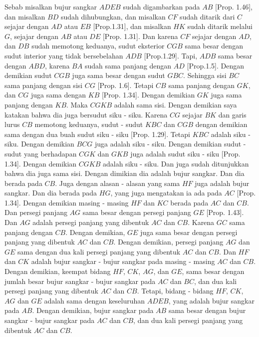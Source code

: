 \documentclass[a4paper]{book}
\begin{document}
Sebab misalkan bujur sangkar $ADEB$ sudah digambarkan pada $AB$ [Prop. 1.46], dan
misalkan $BD$ sudah dihubungkan, dan misalkan $CF$ sudah ditarik dari $C$ sejajar
dengan $AD$ atau $EB$ [Prop.1.31], dan misalkan $HK$ sudah ditarik melalui $G$, 
sejajar dengan $AB$ atau $DE$ [Prop. 1.31]. Dan karena $CF$ sejajar dengan $AD$, 
dan $DB$ sudah memotong keduanya, sudut eksterior $CGB$ sama besar dengan sudut
interior yang tidak bersebelahan $ADB$ [Prop.1.29]. Tapi, $ADB$ sama besar dengan
$ABD$, karena $BA$ sudah sama panjang dengan $AD$ [Prop.1.5]. Dengan demikian 
sudut $CGB$ juga sama besar dengan sudut $GBC$. Sehingga sisi $BC$ sama panjang
dengan sisi $CG$ [Prop. 1.6]. Tetapi $CB$ sama panjang dengan $GK$, dan $CG$ 
juga sama dengan $KB$ [Prop. 1.34]. Dengan demikian $GK$ juga sama panjang dengan 
$KB$. Maka $CGKB$ adalah sama sisi. Dengan demikian saya katakan bahwa dia juga
bersudut siku - siku. Karena $CG$ sejajar $BK$ dan garis lurus $CB$ memotong 
keduanya, sudut - sudut $KBC$ dan $CGB$ dengan demikian sama dengan dua buah sudut
siku - siku [Prop. 1.29]. Tetapi $KBC$ adalah siku - siku. Dengan demikian
$BCG$ juga adalah siku - siku. Dengan demikian sudut - sudut yang berhadapan
$CGK$ dan $GKB$ juga adalah sudut siku - siku [Prop. 1.34]. Dengan demikian
$CGKB$ adalah siku - siku. Dan juga sudah ditunjukkan bahwa dia juga sama sisi. 
Dengan dimikian dia adalah bujur sangkar. Dan dia berada pada $CB$. 
Juga dengan alasan - alasan yang sama $HF$ juga adalah bujur sangkar. Dan  dia 
berada pada $HG$, yang juga mengatakan ia ada pada $AC$ [Prop. 1.34]. Dengan 
demikian masing - masing $HF$ dan $KC$  berada pada $AC$ dan $CB$. Dan 
persegi panjang $AG$ sama besar dengan persegi panjang $GE$ [Prop. 1.43]. Dan 
$AG$ adalah persegi panjang yang dibentuk $AC$ dan $CB$. 
Karena $GC$ sama panjang dengan $CB$. Dengan demikian, $GE$ juga sama besar 
dengan persegi panjang yang dibentuk $AC$ dan $CB$. Dengan demikian, persegi 
panjang $AG$ dan $GE$ sama dengan dua kali persegi panjang yang dibentuk
$AC$ dan $CB$. Dan $HF$ dan $CK$ adalah bujur sangkar - bujur sangkar pada 
masing - masing $AC$ dan $CB$. Dengan demikian, keempat bidang $HF$, $CK$, 
$AG$, dan $GE$, sama besar dengan jumlah besar bujur sangkar - bujur sangkar
pada $AC$ dan $BC$, dan dua kali persegi panjang yang dibentuk $AC$ dan 
$CB$. Tetapi, bidang - bidang $HF$, $CK$, $AG$ dan $GE$ adalah sama dengan
keseluruhan $ADEB$, yang adalah bujur sangkar pada $AB$. Dengan demikian, 
bujur sangkar pada $AB$ sama besar dengan bujur sangkar - bujur sangkar pada 
$AC$ dan $CB$, dan dua kali persegi panjang yang dibentuk $AC$ dan $CB$.
\end{document}
